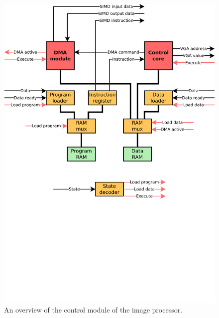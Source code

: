 \begin{figure}[h!]
\centering
\includegraphics[width=\linewidth,clip,trim=0 10cm 0 0]
                {fig/fpga/control_module.pdf}
\caption[Control module]
        {An overview of the control module of the image processor.}
\label{fig:control-module}
\end{figure}
